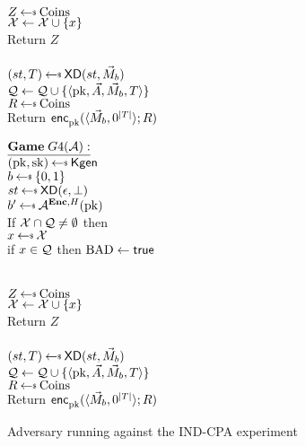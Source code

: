 \begin{figure}[tbhp]
\begin{center}
{\medskip
{}\\
  $Z \getsr \mathrm{Coins}$\\
  $\mathcal{X} \gets \mathcal{X} \cup \{x\}$\\
  Return $Z$\\

\medskip
{}\\
$(st, T) \getsr \mdalg(st,\vmsg_b)$\\
$\mathcal{Q} \gets \mathcal{Q} \cup \{\langle \mathrm{pk},\vec{A},\vec{M}_b,T\rangle\}$\\
$R \getsr \mathrm{Coins}$\\
Return ${\mathsf{enc}}_{\mathrm{pk}}^{}(\langle \vec{M}_b, 0^{|T|}\rangle; R)$\\
}
{
$\gamev{G4}{\advA}$\\
 $(\pk,\sk)\getsr\Kgen$\\
$ b \getsr \bits$\\
 $st \getsr \mdalg(\epsilon,\bot)$\\
 $b' \getsr \advA^{\encOracle,H}(\pk)$\\
 If $\mathcal{X} \cap \mathcal{Q} \neq \emptyset$ then \\
\nudge $ x \getsr \calX$\\
\nudge if $x \in \mathcal{Q}$ then $\mathrm{BAD}\gets\textsf{true}$

\medskip
{}\\
  $Z \getsr \mathrm{Coins}$\\
  $\mathcal{X} \gets \mathcal{X} \cup \{x\}$\\
  Return $Z$\\

\medskip
{}\\
$(st, T) \getsr \mdalg(st,\vmsg_b)$\\
$\mathcal{Q} \gets \mathcal{Q} \cup \{\langle \mathrm{pk},\vec{A},\vec{M}_b,T\rangle\}$\\
$R \getsr \mathrm{Coins}$\\
Return ${\mathsf{enc}}_{\mathrm{pk}}^{}(\langle \vec{M}_b, 0^{|T|}\rangle; R)$\\
}
\fi
\caption{Adversary running against the IND-CPA experiment }
\label{fig:CPA-adv}
\end{center}
\end{figure}

